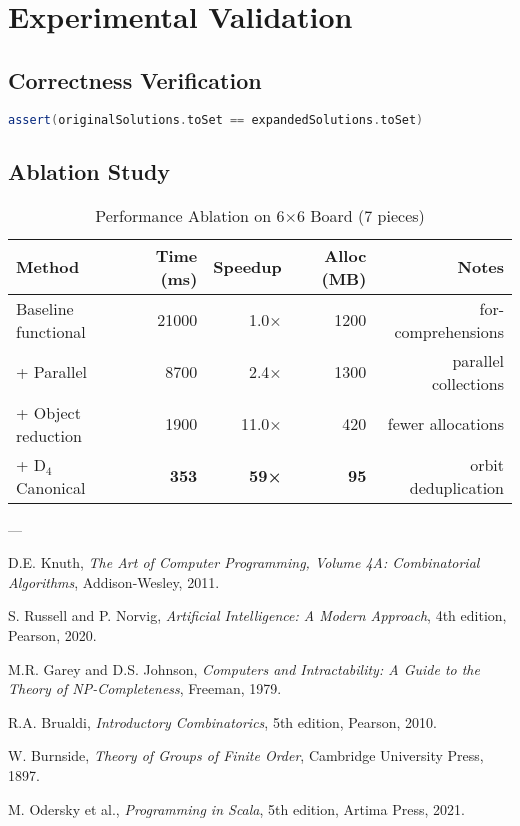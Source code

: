 \documentclass[12pt,a4paper]{article}
\theoremstyle{definition}
\begin{document}
\section{Experimental Validation}

\subsection{Correctness Verification}

\begin{lstlisting}[language=Scala]
assert(originalSolutions.toSet == expandedSolutions.toSet)
\end{lstlisting}

\subsection{Ablation Study}

\begin{table}[h]
\centering
\caption{Performance Ablation on 6$\times$6 Board (7 pieces)}
\begin{tabular}{@{}lrrrr@{}}
\toprule
Method & Time (ms) & Speedup & Alloc (MB) & Notes \\
\midrule
Baseline functional & 21000 & 1.0× & 1200 & for-comprehensions \\
+ Parallel          & 8700  & 2.4× & 1300 & parallel collections \\
+ Object reduction  & 1900  & 11.0× & 420 & fewer allocations \\
+ D$_4$ Canonical   & \textbf{353} & \textbf{59×} & \textbf{95} & orbit deduplication \\
\bottomrule
\end{tabular}
\end{table}

---


\begin{thebibliography}{99}

D.E. Knuth, \emph{The Art of Computer Programming, Volume 4A: Combinatorial Algorithms}, Addison-Wesley, 2011.

S. Russell and P. Norvig, \emph{Artificial Intelligence: A Modern Approach}, 4th edition, Pearson, 2020.

M.R. Garey and D.S. Johnson, \emph{Computers and Intractability: A Guide to the Theory of NP-Completeness}, Freeman, 1979.

R.A. Brualdi, \emph{Introductory Combinatorics}, 5th edition, Pearson, 2010.

W. Burnside, \emph{Theory of Groups of Finite Order}, Cambridge University Press, 1897.

M. Odersky et al., \emph{Programming in Scala}, 5th edition, Artima Press, 2021.

\end{thebibliography}
\end{document}
